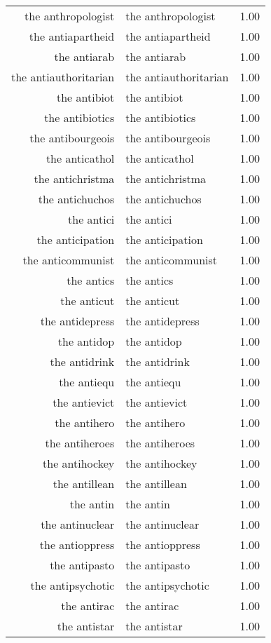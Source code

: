 \begin{table}[ht]
\begin{tabular}{rlr}
  the anthropologist & the anthropologist & 1.00 \\ 
  the antiapartheid & the antiapartheid & 1.00 \\ 
  the antiarab & the antiarab & 1.00 \\ 
  the antiauthoritarian & the antiauthoritarian & 1.00 \\ 
  the antibiot & the antibiot & 1.00 \\ 
  the antibiotics & the antibiotics & 1.00 \\ 
  the antibourgeois & the antibourgeois & 1.00 \\ 
  the anticathol & the anticathol & 1.00 \\ 
  the antichristma & the antichristma & 1.00 \\ 
  the antichuchos & the antichuchos & 1.00 \\ 
  the antici & the antici & 1.00 \\ 
  the anticipation & the anticipation & 1.00 \\ 
  the anticommunist & the anticommunist & 1.00 \\ 
  the antics & the antics & 1.00 \\ 
  the anticut & the anticut & 1.00 \\ 
  the antidepress & the antidepress & 1.00 \\ 
  the antidop & the antidop & 1.00 \\ 
  the antidrink & the antidrink & 1.00 \\ 
  the antiequ & the antiequ & 1.00 \\ 
  the antievict & the antievict & 1.00 \\ 
  the antihero & the antihero & 1.00 \\ 
  the antiheroes & the antiheroes & 1.00 \\ 
  the antihockey & the antihockey & 1.00 \\ 
  the antillean & the antillean & 1.00 \\ 
  the antin & the antin & 1.00 \\ 
  the antinuclear & the antinuclear & 1.00 \\ 
  the antioppress & the antioppress & 1.00 \\ 
  the antipasto & the antipasto & 1.00 \\ 
  the antipsychotic & the antipsychotic & 1.00 \\ 
  the antirac & the antirac & 1.00 \\ 
  the antistar & the antistar & 1.00 \\ 

\end{tabular}
\end{table}
